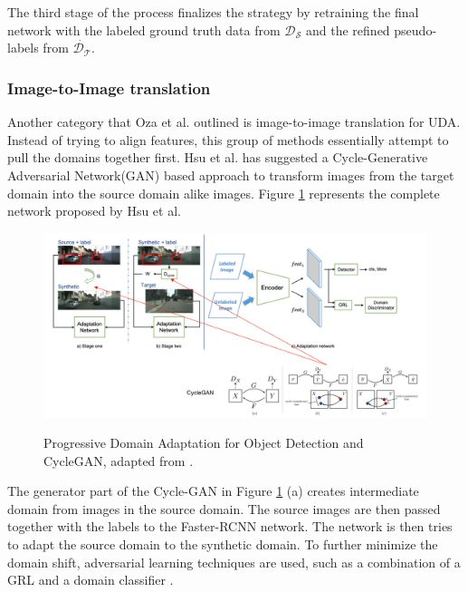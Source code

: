 \documentclass[english, 12pt, a4paper, elec, utf8, a-1b, online]{aaltothesis}
\begin{document}
The third stage of the process finalizes the strategy by retraining the final network with the labeled ground truth data from $\mathcal{D_S}$ and the refined pseudo-labels from $\dot{\mathcal{D_T}}$. 


\subsubsection{Image-to-Image translation}
\label{imagetoimage} 
Another category that Oza et al. \cite{Oza2021} outlined is image-to-image translation for UDA. Instead of trying to align features, this group of methods essentially attempt to pull the domains together first. Hsu et al. \cite{Hsu2019} has suggested a Cycle-Generative Adversarial Network(GAN) \cite{Zhu2017} based approach to transform images from the target domain into the source domain alike images. Figure \ref{gan} represents the complete network proposed by Hsu et al. 

\begin{figure}[htb]
	\begin{center}
		\includegraphics[width=16cm]{./GAN.png}
	\end{center}
	\caption{Progressive Domain Adaptation for Object Detection and CycleGAN, adapted from \cite{Hsu2019}.}
	\begin{center}
		\label{gan}
	\end{center}
\end{figure}
\FloatBarrier

The generator part of the Cycle-GAN in Figure \ref{gan} (a) creates intermediate domain from images in the source domain. The source images are then passed together with the labels to the Faster-RCNN network. The network is then tries to adapt the source domain to the synthetic domain. To further minimize the domain shift, adversarial learning techniques are used, such as a combination of a GRL and a domain classifier \cite{Hsu2019}.
\end{document}

